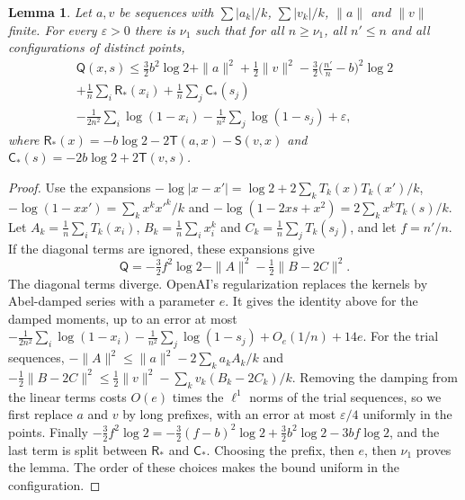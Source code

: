 \documentclass[11pt]{amsart}
\newtheorem{lemma}[theorem]{Lemma}
\theoremstyle{definition}
\theoremstyle{remark}
\numberwithin{equation}{section}
\begin{document}
\begin{lemma}\label{lem:freetangent}
Let $a,v$ be sequences with $\sum|a_k|/k$, $\sum|v_k|/k$, $\|a\|$ and $\|v\|$ finite. For every $\varepsilon>0$ there is $\nu_1$ such that
for all $n\ge\nu_1$, all $n'\le n$ and all configurations of distinct points,
\begin{multline*}
 \mathsf Q(x,s)\le\tfrac32b^2\log2+\|a\|^2+\tfrac12\|v\|^2-\tfrac32\bigl(\tfrac{n'}n-b\bigr)^2\log2\\
 +\frac1n\sum_i\mathsf R_*(x_i)+\frac1n\sum_j\mathsf C_*(s_j)\\
 -\frac1{2n^2}\sum_i\log(1-x_i)-\frac1{n^2}\sum_j\log(1-s_j)+\varepsilon,
\end{multline*}
where $\mathsf R_*(x)=-b\log2-2\mathsf T(a,x)-\mathsf S(v,x)$ and $\mathsf C_*(s)=-2b\log2+2\mathsf T(v,s)$.
\end{lemma}

\begin{proof}
Use the expansions $-\log|x-x'|=\log2+2\sum_kT_k(x)T_k(x')/k$, $-\log(1-xx')=\sum_kx^kx'^k/k$ and
$-\log(1-2xs+x^2)=2\sum_kx^kT_k(s)/k$. Let $A_k=\frac1n\sum_iT_k(x_i)$, $B_k=\frac1n\sum_ix_i^k$ and $C_k=\frac1n\sum_jT_k(s_j)$, and let $f=n'/n$.
If the diagonal terms are ignored, these expansions give
\[
 \mathsf Q=-\tfrac32f^2\log2-\|A\|^2-\tfrac12\|B-2C\|^2 .
\]
The diagonal terms diverge. OpenAI's regularization \cite[\S5]{OpenAI2026} replaces the kernels by Abel-damped series with a parameter $e$.
It gives the identity above for the damped moments, up to an error at most
$-\frac1{2n^2}\sum_i\log(1-x_i)-\frac1{n^2}\sum_j\log(1-s_j)+O_e(1/n)+14e$. For the trial sequences, $-\|A\|^2\le\|a\|^2-2\sum_ka_kA_k/k$ and
$-\frac12\|B-2C\|^2\le\frac12\|v\|^2-\sum_kv_k(B_k-2C_k)/k$. Removing the damping from the linear terms costs $O(e)$ times the $\ell^1$ norms of the trial
sequences, so we first replace $a$ and $v$ by long prefixes, with an error at most $\varepsilon/4$ uniformly in the points. Finally
$-\frac32f^2\log2=-\frac32(f-b)^2\log2+\frac32b^2\log2-3bf\log2$, and the last term is split between $\mathsf R_*$ and $\mathsf C_*$. Choosing the prefix, then $e$, then $\nu_1$
proves the lemma. The order of these choices makes the bound uniform in the configuration.
\end{proof}
\end{document}
